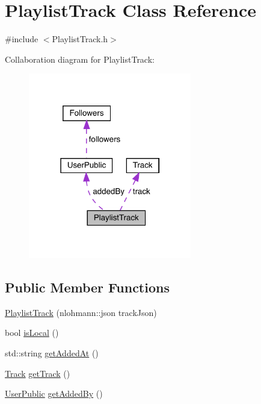 \hypertarget{class_playlist_track}{}\section{Playlist\+Track Class Reference}
\label{class_playlist_track}


{\ttfamily \#include $<$Playlist\+Track.\+h$>$}



Collaboration diagram for Playlist\+Track\+:
\nopagebreak
\begin{figure}[H]
\begin{center}
\leavevmode
\includegraphics[width=202pt]{class_playlist_track__coll__graph}
\end{center}
\end{figure}
\subsection*{Public Member Functions}
\begin{DoxyCompactItemize}
\item 
\mbox{\hyperlink{class_playlist_track_ac1ba89a8b37d090beb680c4343eb6502}{Playlist\+Track}} (nlohmann\+::json track\+Json)
\item 
bool \mbox{\hyperlink{class_playlist_track_a5cc73ec3bc42d9c310c0ee91a154f67b}{is\+Local}} ()
\item 
std\+::string \mbox{\hyperlink{class_playlist_track_ad0cc1579fe0b84b91dd7a3dc882417e1}{get\+Added\+At}} ()
\item 
\mbox{\hyperlink{class_track}{Track}} \mbox{\hyperlink{class_playlist_track_a8f3876cbee0c4757c9d17952447ad7c9}{get\+Track}} ()
\item 
\mbox{\hyperlink{class_user_public}{User\+Public}} \mbox{\hyperlink{class_playlist_track_a5bf0fcdb947eb2b4ae8497ffa8f4d96a}{get\+Added\+By}} ()
\end{DoxyCompactItemize}
